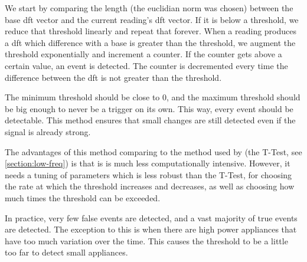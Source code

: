 We start by comparing the length (the euclidian norm was chosen) between the base \acrshort{dft} vector and the current reading's \acrshort{dft} vector. If it is below a threshold, we reduce that threshold linearly and repeat that forever. When a reading produces a \acrshort{dft} which difference with a base is greater than the threshold, we augment the threshold exponentially and increment a counter. If the counter gets above a certain value, an event is detected. The counter is decremented every time the difference between the \acrshort{dft} is not greater than the threshold.

The minimum threshold should be close to 0, and the maximum threshold should be big enough to never be a trigger on its own. This way, every event should be detectable. This method ensures that small changes are still detected even if the signal is already strong.

The advantages of this method comparing to the method used by \cite{bruneel2018energy} (the T-Test, see \autoref{section:low-freq}) is that is is much less computationally intensive. However, it needs a tuning of parameters which is less robust than the T-Test, for choosing the rate at which the threshold increases and decreases, as well as choosing how much times the threshold can be exceeded.

In practice, very few false events are detected, and a vast majority of true events are detected. The exception to this is when there are high power appliances that have too much variation over the time. This causes the threshold to be a little too far to detect small appliances.
